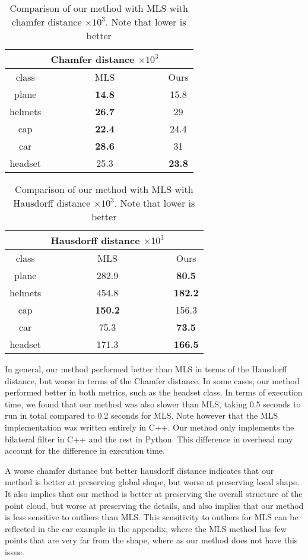 \begin{table}[H]
\centering
\begin{tabular}{ccc}
	& Chamfer distance $\times 10^3$ &\\
	\hline
	class & MLS & Ours \\
	\hline
	plane & \textbf{14.8} & 15.8 \\ 
	helmets & \textbf{26.7} & 29 \\
	cap & \textbf{22.4} & 24.4 \\  
	car & \textbf{28.6} & 31 \\  
	headset & {25.3} & \textbf{23.8}  \\
\end{tabular}
\caption{Comparison of our method with MLS with chamfer distance $\times 10^3$. Note that lower is better}
\end{table}

\begin{table}[H]
\centering
\begin{tabular}{ccc}
	& Hausdorff distance $\times 10^3$ &\\
	\hline
	class & MLS & Ours \\
	\hline
	plane & 282.9 & \textbf{80.5} \\ 
helmets & 454.8 &  \textbf{182.2}\\
cap & \textbf{150.2} & 156.3 \\ 
car & 75.3 & \textbf{73.5} \\  
headset & 171.3 & \textbf{166.5} \\
\end{tabular}
\caption{Comparison of our method with MLS with Hausdorff distance $\times 10^3$. Note that lower is better}
\end{table}

In general, our method performed better than MLS in terms of the Hausdorff distance, but worse in terms of the Chamfer distance.
In some cases, our method performed better in both metrics, such as the headset class.
In terms of execution time, we found that our method was also slower than MLS, taking 0.5 seconds to run in total compared to 0.2 seconds for MLS.
Note however that the MLS implementation was written entirely in C++. Our method only implements the bilateral filter in C++ and the rest in Python. 
This difference in overhead may account for the difference in execution time.

A worse chamfer distance but better hausdorff distance indicates that our method is better at preserving global shape, but worse at preserving local shape.
It also implies that our method is better at preserving the overall structure of the point cloud, but worse at preserving the details, and also implies that our method is less sensitive to outliers than MLS.
This sensitivity to outliers for MLS can be reflected in the car example in the appendix, where the MLS method has few points that are very far from the shape, where as our method does not have this issue.

